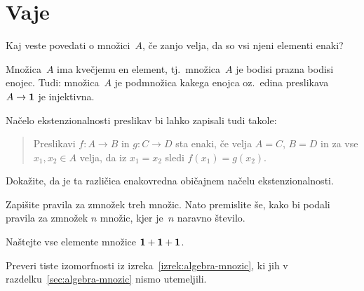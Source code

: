 \section{Vaje}

\begin{vaja}
Kaj veste povedati o množici~$A$, če zanjo velja, da so vsi njeni elementi enaki?
\begin{resitev}
Množica~$A$ ima kvečjemu en element, tj.~množica~$A$ je bodisi prazna bodisi enojec. Tudi: množica~$A$ je podmnožica kakega enojca oz.~edina preslikava $A \to \mathtt{\mathbf{1}}$ je injektivna.
\end{resitev}
\end{vaja}

\begin{vaja}
  Načelo ekstenzionalnosti preslikav bi lahko zapisali tudi takole:
  \begin{quote}
    Preslikavi $f : A \to B$ in $g : C \to D$ sta enaki, če velja $A = C$, $B = D$ in za
    vse $x_1, x_2 \in A$ velja, da iz $x_1 = x_2$ sledi $f(x_1) = g(x_2)$.
  \end{quote}
  Dokažite, da je ta različica enakovredna običajnem načelu ekstenzionalnosti.
\end{vaja}

\begin{vaja}
  Zapišite pravila za zmnožek treh množic. Nato premislite še, kako bi podali pravila za
  zmnožek $n$ množic, kjer je~$n$ naravno število.
\end{vaja}

\begin{vaja}
  Naštejte vse elemente množice $\mathtt{\mathbf{1}} + \mathtt{\mathbf{1}} + \mathtt{\mathbf{1}}$.
\end{vaja}

\begin{vaja}
  Preveri tiste izomorfnosti iz izreka~\ref{izrek:algebra-mnozic}, ki jih v
  razdelku~\ref{sec:algebra-mnozic} nismo utemeljili.
\end{vaja}

